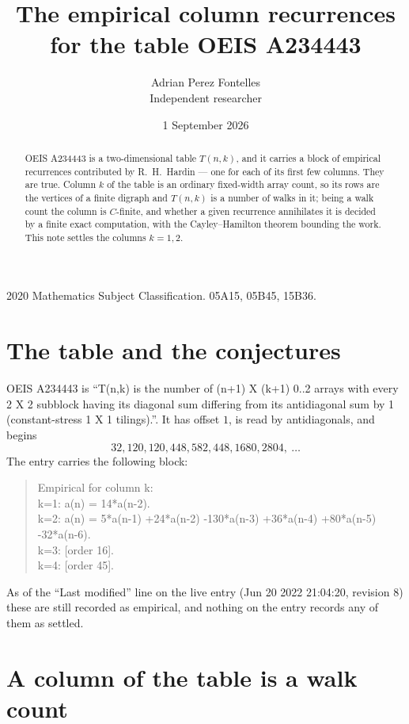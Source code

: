 \documentclass[11pt,a4paper]{article}
\title{The empirical column recurrences for the table OEIS A234443}
\author{Adrian Perez Fontelles\\ \small Independent researcher}
\date{1 September 2026}
\theoremstyle{plain}
\theoremstyle{definition}
\begin{document}
\maketitle

\begin{abstract}
OEIS A234443 is a two-dimensional table $T(n,k)$, and it carries a block of empirical
recurrences contributed by R.~H.~Hardin --- one for each of its first few columns. They are
true. Column $k$ of the table is an ordinary fixed-width array count, so its rows are the
vertices of a finite digraph and $T(n,k)$ is a number of walks in it; being a walk count the
column is $C$-finite, and whether a given recurrence annihilates it is decided by a finite
exact computation, with the Cayley--Hamilton theorem bounding the work. This note settles the columns $k=1, 2$.
\end{abstract}

\noindent\small 2020 Mathematics Subject Classification. 05A15, 05B45, 15B36.\normalsize

\section{The table and the conjectures}

OEIS A234443 is ``T(n,k) is the number of (n+1) X (k+1) 0..2 arrays with every 2 X 2 subblock having its diagonal sum differing from its antidiagonal sum by 1 (constant-stress 1 X 1 tilings).''. It has offset $1$, is
read by antidiagonals, and begins
\[
32, 120, 120, 448, 582, 448, 1680, 2804,\ \dots
\]
The entry carries the following block:
\begin{quote}\small
Empirical for column k:\\
k=1: a(n) = 14*a(n-2).\\
k=2: a(n) = 5*a(n-1) +24*a(n-2) -130*a(n-3) +36*a(n-4) +80*a(n-5) -32*a(n-6).\\
k=3: [order 16].\\
k=4: [order 45].\\
\end{quote}
As of the ``Last modified'' line on the live entry (Jun 20 2022 21:04:20, revision 8) these are still
recorded as empirical, and nothing on the entry records any of them as settled.

\section{A column of the table is a walk count}
\end{document}
